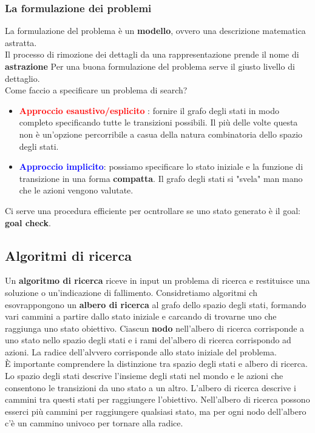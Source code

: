 \documentclass{article}
\begin{document}
\subsubsection{La formulazione dei problemi}
La formulazione del problema è un \textbf{modello}, ovvero una descrizione matematica astratta.\\ Il processo di rimozione dei dettagli da una rappresentazione prende il nome di \textbf{astrazione} Per una buona formulazione del problema serve il giusto livello di dettaglio.
\\
Come faccio a specificare un problema di search?
\begin{itemize}
    \item \textbf{\textcolor{red}{Approccio esaustivo/esplicito} }: fornire il grafo degli stati in modo completo specificando tutte le transizioni possibili. Il più delle volte questa non è un'opzione percorribile a casua della natura combinatoria dello spazio degli stati.
    \item \textbf{\textcolor{blue}{Approccio implicito}}: possiamo specificare lo stato iniziale e la funzione di transizione in una forma \textbf{compatta}. Il grafo degli stati si "svela" man mano che le azioni vengono valutate.
\end{itemize}
Ci serve una procedura efficiente per ocntrollare se uno stato generato è il goal: \textbf{goal check}.

\subsection{Algoritmi di ricerca}
Un \textbf{algoritmo di ricerca} riceve in input un problema di ricerca e restituisce una soluzione o un'indicazione di fallimento. Considretiamo algoritmi ch esovrappongono un \textbf{albero di ricerca} al grafo dello spazio degli stati, formando vari cammini a partire dallo stato iniziale e carcando di trovarne uno che raggiunga uno stato obiettivo. Ciascun \textbf{nodo} nell'albero di ricerca corrisponde a uno stato nello spazio degli stati e i rami del'albero di ricerca corrispondo ad azioni. La radice dell'alvvero corrisponde allo stato iniziale del problema.
\\ È importante comprendere la distinzione tra spazio degli stati e albero di ricerca. Lo spazio degli stati descrive l'insieme degli stati nel mondo e le azioni che consentono le transizioni da uno stato a un altro. L'albero di ricerca descrive i cammini tra questi stati per raggiungere l'obiettivo. Nell'albero di ricerca possono esserci più cammini per raggiungere qualsiasi stato, ma per ogni nodo dell'albero c'è un cammino univoco per tornare alla radice.
\end{document}
